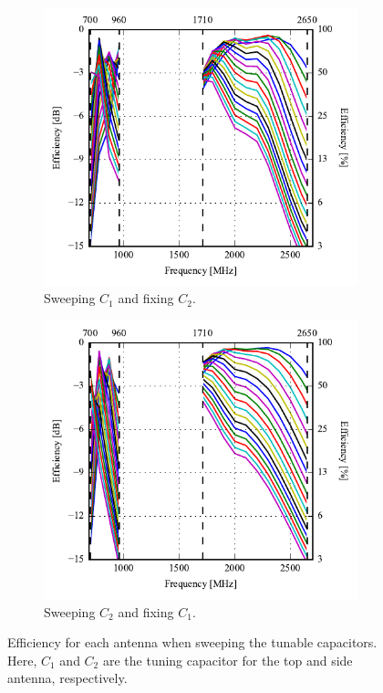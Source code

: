 \begin{figure}[htbp]
    \centering
    \begin{subfigure}{0.49\linewidth}
        \includegraphics{img/tech_sol/monopole/5mm/6pf_eff_ac1}
        \caption{Sweeping $C_1$ and fixing $C_2$.}
    \end{subfigure}
    \hfill
    \begin{subfigure}{0.49\linewidth}
        \includegraphics{img/tech_sol/monopole/5mm/6pf_eff_ac2}
        \caption{Sweeping $C_2$ and fixing $C_1$.}
    \end{subfigure}
    \caption{Efficiency for each antenna when sweeping the tunable capacitors. Here, $C_1$ and $C_2$ are the tuning capacitor for the top and side antenna, respectively.}
    \label{fig:eff_sol1_6pf_free}
\end{figure}

